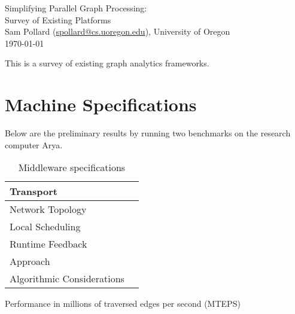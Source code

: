 \documentclass[11pt]{article}
\begin{document}
\begin{center}
{ \huge
	Simplifying Parallel Graph Processing: \\
}
{ \Large
	Survey of Existing Platforms \\
}
Sam Pollard (\href{mailto:spollard@cs.uoregon.edu}{spollard@cs.uoregon.edu}), University of Oregon \\
\today
\end{center}

This is a survey of existing graph analytics frameworks.

\section{Machine Specifications}
Below are the preliminary results by running two benchmarks on the research computer Arya.

\begin{table}[htb]
	\centering

	\caption{Machine specifications.}
	\label{tab:specs}
\end{table}

\begin{table}[htb]
	\centering
	\begin{tabular}{lr}
		Transport & \\ \hline
		Network Topology & \\ \hline
		Local Scheduling & \\ \hline
		Runtime Feedback & \\ \hline
		Approach & \\ \hline
		Algorithmic Considerations & \\ \hline
	\end{tabular}
	\caption{Middleware specifications}
	\label{tab:reportcard}
\end{table}

Performance in millions of traversed edges per second (MTEPS)
\end{document}
